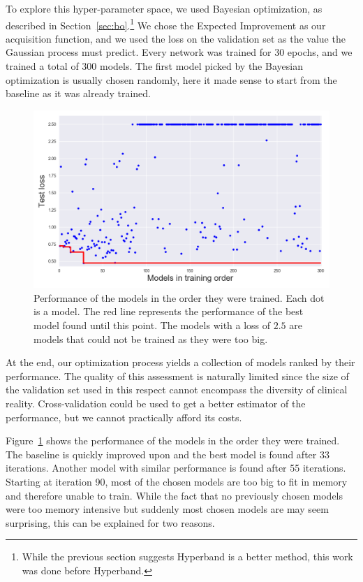To explore this hyper-parameter space, we used Bayesian optimization, as described in Section~\ref{sec:bo}.\footnote{While the previous section suggests Hyperband is a better method, this work was done before Hyperband.} We chose the Expected Improvement as our acquisition function, and we used the loss on the validation set as the value the Gaussian process must predict. Every network was trained for 30 epochs, and we trained a total of 300 models. The first model picked by the Bayesian optimization is usually chosen randomly, here it made sense to start from the baseline as it was already trained.

\begin{figure}[htb]
	\centering
	\includegraphics[width=\linewidth]{img_hyperopt/mrfov_bo_ei}
	\caption[Performance of the models in the order they were trained]{Performance of the models in the order they were trained. Each dot is a model. The red line represents the performance of the best model found until this point. The models with a loss of $2.5$ are models that could not be trained as they were too big.}
	\label{fig:mrfov_bo_ei}
\end{figure}

At the end, our optimization process yields a collection of models ranked by their performance. The quality of this assessment is naturally limited since the size of the validation set used in this respect cannot encompass the diversity of clinical reality. Cross-validation could be used to get a better estimator of the performance, but we cannot practically afford its costs. 

Figure~\ref{fig:mrfov_bo_ei} shows the performance of the models in the order they were trained. The baseline is quickly improved upon and the best model is found after 33 iterations. Another model with similar performance is found after 55 iterations. Starting at iteration 90, most of the chosen models are too big to fit in memory and therefore unable to train. While the fact that no previously chosen models were too memory intensive but suddenly most chosen models are may seem surprising, this can be explained for two reasons.

